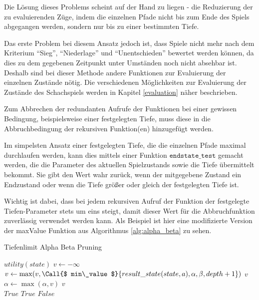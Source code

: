 
Die Lösung dieses Problems scheint auf der Hand zu liegen - die Reduzierung der zu evaluierenden Züge, indem die einzelnen Pfade nicht bis zum Ende des Spiels abgegangen werden, sondern nur bis zu einer bestimmten Tiefe.

Das erste Problem bei diesem Ansatz jedoch ist, dass Spiele nicht mehr nach dem Kriterium ``Sieg'', ``Niederlage'' und ``Unentschieden'' bewertet werden können, da dies zu dem gegebenen Zeitpunkt unter Umständen noch nicht absehbar ist. Deshalb sind bei dieser Methode andere Funktionen zur Evaluierung der einzelnen Zustände nötig. Die verschiedenen Möglichkeiten zur Evaluierung der Zustände des Schachspiels werden in Kapitel \ref{evaluation} näher beschrieben.

Zum Abbrechen der redundanten Aufrufe der Funktionen bei einer gewissen Bedingung, beispielsweise einer festgelegten Tiefe, muss diese in die Abbruchbedingung der rekursiven Funktion(en) hinzugefügt werden. 

Im simpelsten Ansatz einer festgelegten Tiefe, die die einzelnen Pfade maximal durchlaufen werden, kann dies mittels einer Funktion $\mathtt{endstate\_test}$ gemacht werden, die die Parameter des aktuellen Spielzustands sowie die Tiefe übermittelt bekommt. Sie gibt den Wert wahr zurück, wenn der mitgegebene Zustand ein Endzustand oder wenn die Tiefe größer oder gleich der festgelegten Tiefe ist. \cite{Russell2010}

Wichtig ist dabei, dass bei jedem rekursiven Aufruf der Funktion der festgelegte Tiefen-Parameter stets um eins steigt, damit dieser Wert für die Abbruchfunktion zuverlässig verwendet werden kann. Als Beispiel ist hier eine modifizierte Version der maxValue Funktion aus Algorithmus \ref{alg:alpha_beta} zu sehen.

\begin{algorithm}[h]
\caption{Tiefenlimit Alpha Beta Pruning \cite{Russell2010}}
\label{alg:depth_limit}
\begin{algorithmic}
 \State \Return $ utility(state) $ \EndIf
\State $ v  \gets -\infty$
\State $ v  \gets \max( v , \Call{$ min\_value $}{ result\_state(state, a) , \alpha, \beta,  depth  + 1})$
 \State \Return $ v $ \EndIf
\State $\alpha \gets \max(\alpha,  v )$
\EndFor
\State \Return $ v $
\EndFunction
\\
 \State \Return $True$ \EndIf
{} \State \Return $True$ \EndIf
\State \Return $False$
\EndFunction 
\end{algorithmic}
\end{algorithm}

